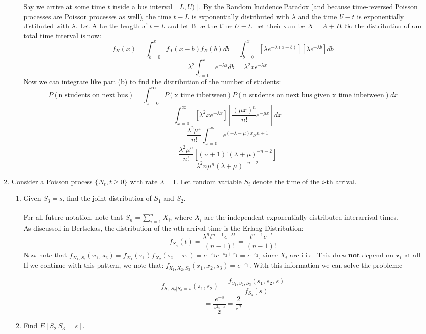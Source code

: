 \begin{enumerate}
\begin{enumerate}
        Say we arrive at some time $t$ inside a bus interval $[L,U)]$. By the Random Incidence Paradox (and because time-reversed Poisson processes are Poisson processes as well), the time $t-L$ is exponentially distributed with $\lambda$ and the time $U-t$ is exponentially distibuted with $\lambda$. Let A be the length of $t-L$ and let B be the time $U-t$. Let their sum be $X = A+B$. So the distribution of our total time interval is now:        
        $$f_X(x) = \int_{b=0}^x f_A(x-b) f_B(b) db = \int_{b=0}^x [\lambda e^{- \lambda (x-b)}][\lambda e^{- \lambda b}] db$$
        $$=\lambda^2 \int_{b=0}^x e^{-\lambda x} db = \lambda^2 x e^{- \lambda x}$$
        Now we can integrate like part (b) to find the distribution of the number of students:
        $$P(\text{n students on next bus}) = \int_{x=0}^\infty P(\text{x time inbetween})P(\text{n students on next bus given x time inbetween}) dx$$
        $$=\int_{x=0}^\infty [\lambda^2 x e^{-\lambda x}][\frac{(\mu x)^n}{n!} e^{- \mu x}] dx$$
        $$= \frac{\lambda^2 \mu^n}{n!} \int_{x=0}^\infty e^{(-\lambda - \mu) x} x^{n+1}$$
        $$= \frac{\lambda^2 \mu^n}{n!} [(n+1)! (\lambda + \mu)^{-n-2}]$$
        $$= \lambda^2 n \mu^n (\lambda + \mu)^{-n-2}$$
    \end{enumerate}

  \item Consider a Poisson process $\{N_t, t \geq 0\}$ with rate $\lambda = 1$. Let random variable $S_i$ denote the time of the $i$-th arrival.
    \begin{enumerate}
      \item Given $S_3 = s$, find the joint distribution of $S_1$ and $S_2$.\\\\

        For all future notation, note that $S_n = \sum_{i=1}^n X_i$, where $X_i$ are the independent exponentially distributed interarrival times.\\
        As discussed in Bertsekas, the distribution of the $n$th arrival time is the Erlang Distribution:
        $$f_{S_n}(t) = \frac{\lambda^n t^{n-1} e^{-\lambda t}}{(n-1)!} = \frac{t^{n-1}e^{-t}}{(n-1)!}$$
        Now note that $f_{X_1, S_2}(x_1,s_2) = f_{X_1}(x_1) f_{X_2} (s_2-x_1) = e^{-x_1} e^{-s_2+x_1} = e^{-s_2}$, since $X_i$ are i.i.d. This does \textbf{not} depend on $x_1$ at all. If we continue with this pattern, we note that:
        $f_{X_1,X_2,S_3}(x_1,x_2,s_3) = e^{-s_3}$. With this information we can solve the problem:c

        $$f_{S_1,S_2|S_3 = s}(s_1,s_2) = \frac{f_{S_1,S_2,S_3}(s_1,s_2,s)}{f_{S_3}(s)}$$
        $$=\frac{e^{-s}}{\frac{s^2 e^{-s}}{2!}} = \frac{2}{s^2}$$
      \item Find $E[S_2 | S_3 = s]$.\\\\


\end{enumerate}
\end{enumerate}
